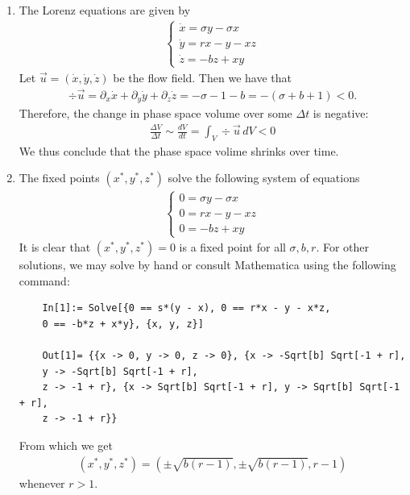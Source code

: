 \documentclass{article}
\theoremstyle{definition}
\newcommand{\p}{\partial}
\newcommand{\f}[2]{\frac{#1}{#2}}
\newcommand{\lp}{\left(}
\newcommand{\rp}{\right)}
\begin{document}
\begin{enumerate}[label=(\alph*)]
	\item The Lorenz equations are given by 
	\begin{align*}
	\begin{cases}
	\dot x = \sigma y - \sigma x \\ 
	\dot y = r x - y - xz \\
	\dot z = -bz + xy
	\end{cases}
	\end{align*}
	Let $\vec{u} = (\dot x, \dot y, \dot z)$ be the flow field. Then we have that
	\begin{align*}
	\div \vec{u} = \p_x \dot x + \p_y \dot y + \p_z \dot z = -\sigma -1-b = -(\sigma + b + 1) < 0.
	\end{align*}
	Therefore, the change in phase space volume over some $\Delta t$ is negative:
	\begin{align*}
	\f{\Delta V}{\Delta t} \sim \f{dV}{dt}  =   \int_V \div \vec{u} \,dV < 0
	\end{align*}
	We thus conclude that the phase space volime shrinks over time. 
	
	
	\item The fixed points $(x^*, y^*, z^*)$ solve the following system of equations
	\begin{align*}
	\begin{cases}
	0 = \sigma y - \sigma x \\ 
	0 = r x - y - xz \\
	0 = -bz + xy
	\end{cases}
	\end{align*}
	It is clear that $\boxed{(x^*,y^*,z^*) = 0}$ is a fixed point for all $\sigma,b,r$. For other solutions, we may solve by hand or consult Mathematica using the following command:
	\begin{lstlisting}
	In[1]:= Solve[{0 == s*(y - x), 0 == r*x - y - x*z, 
	0 == -b*z + x*y}, {x, y, z}]
	
	Out[1]= {{x -> 0, y -> 0, z -> 0}, {x -> -Sqrt[b] Sqrt[-1 + r], 
	y -> -Sqrt[b] Sqrt[-1 + r], 
	z -> -1 + r}, {x -> Sqrt[b] Sqrt[-1 + r], y -> Sqrt[b] Sqrt[-1 + r],
	z -> -1 + r}}
	\end{lstlisting}
	
	From which we get
	\begin{align*}
	\boxed{(x^*,y^*,z^*) = \lp \pm \sqrt{b(r-1)}, \pm \sqrt{b(r-1)}, r-1 \rp }
	\end{align*}
	whenever $r > 1$.
	
	
	

\end{enumerate}
\end{document}
